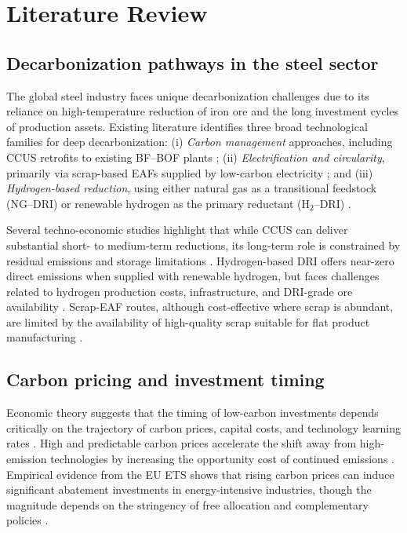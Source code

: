 \documentclass[preprint,5p,authoryear]{elsarticle}
\begin{document}
\section{Literature Review}

\subsection{Decarbonization pathways in the steel sector}
The global steel industry faces unique decarbonization challenges due to its reliance on high-temperature reduction of iron ore and the long investment cycles of production assets. Existing literature identifies three broad technological families for deep decarbonization: (i) \emph{Carbon management} approaches, including CCUS retrofits to existing BF--BOF plants \citep{IEA2020steel}; (ii) \emph{Electrification and circularity}, primarily via scrap-based EAFs supplied by low-carbon electricity \citep{materialeconomics2019}; and (iii) \emph{Hydrogen-based reduction}, using either natural gas as a transitional feedstock (NG--DRI) or renewable hydrogen as the primary reductant (H$_2$--DRI) \citep{bell2022hydrogen}. 

Several techno-economic studies highlight that while CCUS can deliver substantial short- to medium-term reductions, its long-term role is constrained by residual emissions and storage limitations \citep{fennell2022decarbonising}. Hydrogen-based DRI offers near-zero direct emissions when supplied with renewable hydrogen, but faces challenges related to hydrogen production costs, infrastructure, and DRI-grade ore availability \citep{vogl2018hydrogen}. Scrap-EAF routes, although cost-effective where scrap is abundant, are limited by the availability of high-quality scrap suitable for flat product manufacturing \citep{IEA2020steel}.

\subsection{Carbon pricing and investment timing}
Economic theory suggests that the timing of low-carbon investments depends critically on the trajectory of carbon prices, capital costs, and technology learning rates \citep{grubb2014planetary}. High and predictable carbon prices accelerate the shift away from high-emission technologies by increasing the opportunity cost of continued emissions \citep{pizer2002combining}. Empirical evidence from the EU ETS shows that rising carbon prices can induce significant abatement investments in energy-intensive industries, though the magnitude depends on the stringency of free allocation and complementary policies \citep{calel2016innovation}.
\end{document}
